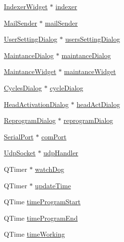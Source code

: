 \begin{DoxyCompactItemize}
\item 
\mbox{\hyperlink{classIndexerWidget}{Indexer\+Widget}} $\ast$ \mbox{\hyperlink{classMainWindow_a2a9bf85f8e206a2db53a4a01a3531367}{indexer}}
\item 
\mbox{\hyperlink{classMailSender}{Mail\+Sender}} $\ast$ \mbox{\hyperlink{classMainWindow_a69258924e6672d7a887839b5c327a0b1}{mail\+Sender}}
\item 
\mbox{\hyperlink{classUserSettingDialog}{User\+Setting\+Dialog}} $\ast$ \mbox{\hyperlink{classMainWindow_aac26d8e6ed8e1afe7405cddec279f3ae}{users\+Setting\+Dialog}}
\item 
\mbox{\hyperlink{classMaintanceDialog}{Maintance\+Dialog}} $\ast$ \mbox{\hyperlink{classMainWindow_a0a1edb572efa46ec0d2b938ed6ebf876}{maintance\+Dialog}}
\item 
\mbox{\hyperlink{classMaintanceWidget}{Maintance\+Widget}} $\ast$ \mbox{\hyperlink{classMainWindow_a932658effa63d92d234d9fe0be097f17}{maintance\+Widget}}
\item 
\mbox{\hyperlink{classCyclesDialog}{Cycles\+Dialog}} $\ast$ \mbox{\hyperlink{classMainWindow_ae3d19fe8260d3c71218159a3fbb07247}{cycle\+Dialog}}
\item 
\mbox{\hyperlink{classHeadActivationDialog}{Head\+Activation\+Dialog}} $\ast$ \mbox{\hyperlink{classMainWindow_ade9f7ec0590bb905ef05f36b5f1ff375}{head\+Act\+Dialog}}
\item 
\mbox{\hyperlink{classReprogramDialog}{Reprogram\+Dialog}} $\ast$ \mbox{\hyperlink{classMainWindow_a70160014215b6053d8bcd08f797c2d99}{reprogram\+Dialog}}
\item 
\mbox{\hyperlink{classSerialPort}{Serial\+Port}} $\ast$ \mbox{\hyperlink{classMainWindow_a5ff9608e15352bd8134510f71adec645}{com\+Port}}
\item 
\mbox{\hyperlink{classUdpSocket}{Udp\+Socket}} $\ast$ \mbox{\hyperlink{classMainWindow_a02e8becbdef8a4a64947536d83a5a0de}{udp\+Handler}}
\item 
Q\+Timer $\ast$ \mbox{\hyperlink{classMainWindow_ace7bf6dfd47ef0be2fd33e7bdfe12f45}{watch\+Dog}}
\item 
Q\+Timer $\ast$ \mbox{\hyperlink{classMainWindow_ad1c1f98b63a93fc70964304d1b0006be}{update\+Time}}
\item 
Q\+Time \mbox{\hyperlink{classMainWindow_a5c567ee1bf6cac065f7c1217a76dbb79}{time\+Program\+Start}}
\item 
Q\+Time \mbox{\hyperlink{classMainWindow_a42fcbf877e14a05140136a65fdfd70a8}{time\+Program\+End}}
\item 
Q\+Time \mbox{\hyperlink{classMainWindow_a22176130c60005fad11cbc01de405480}{time\+Working}}

\end{DoxyCompactItemize}
